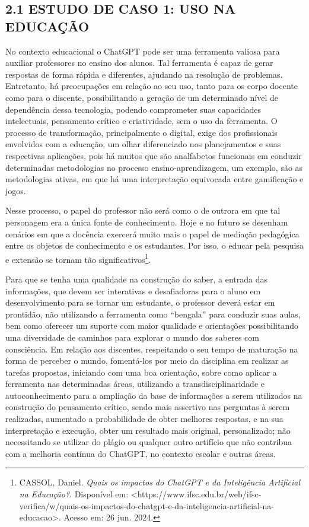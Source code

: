 \subsection*{{2.1 ESTUDO DE CASO 1: USO NA EDUCAÇÃO}}
No contexto educacional o ChatGPT pode ser uma ferramenta valiosa para auxiliar professores no ensino dos alunos. Tal ferramenta é capaz de gerar respostas de forma rápida e diferentes, ajudando na resolução de problemas. Entretanto, há preocupações em relação ao seu uso, tanto para os corpo docente como para o discente, possibilitando a geração de um determinado nível de dependência dessa tecnologia, podendo comprometer suas capacidades intelectuais, pensamento crítico e criatividade, sem o uso da ferramenta. O processo de transformação, principalmente o digital, exige dos profissionais envolvidos com a educação, um olhar diferenciado nos planejamentos e suas respectivas aplicações, pois há muitos que são analfabetos funcionais em conduzir determinadas metodologias no processo ensino-aprendizagem, um exemplo, são as metodologias ativas, em que há uma interpretação equivocada entre gamificação e jogos. 

Nesse processo, o papel do professor não será como o de outrora em que tal personagem era a única fonte de conhecimento. Hoje e no futuro se desenham cenários em que a docência exercerá muito mais o papel de mediação pedagógica entre os objetos de conhecimento e os estudantes. Por isso, o educar pela pesquisa e extensão se tornam tão significativos\footnote{CASSOL, Daniel. \textit{Quais os impactos do ChatGPT e da Inteligência Artificial na Educação?}. Disponível em: <https://www.ifsc.edu.br/web/ifsc-verifica/w/quais-os-impactos-do-chatgpt-e-da-inteligencia-artificial-na-educacao>. Acesso em: 26 jun. 2024.}.

Para que se tenha uma qualidade na construção do saber, a entrada das informações, que devem ser interativas e desafiadoras para o aluno em  desenvolvimento para se tornar um estudante, o professor deverá estar em prontidão, não utilizando a ferramenta como “bengala” para conduzir suas aulas, bem como oferecer um suporte com maior qualidade e orientações possibilitando uma diversidade de caminhos para explorar o mundo dos saberes com consciência. Em relação aos discentes, respeitando o seu tempo de maturação na forma de perceber o mundo, fomentá-los por meio da disciplina em realizar as tarefas propostas, iniciando com uma boa orientação, sobre como aplicar a ferramenta nas determinadas áreas, utilizando a transdisciplinaridade e autoconhecimento para a ampliação da base de informações a serem utilizados na construção do pensamento crítico, sendo mais assertivo nas perguntas à serem realizadas, aumentado a probabilidade de obter melhores respostas, e na sua interpretação e execução, obter um resultado mais original, personalizado; não necessitando se utilizar do plágio ou qualquer outro artifício que não contribua com a melhoria contínua do ChatGPT, no contexto escolar e outras áreas. 


